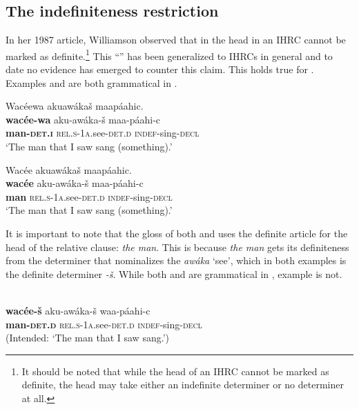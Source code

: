 \documentclass[output=paper]{LSP/langsci}
\begin{document}
\subsection{The indefiniteness restriction}\label{sec:boyle:4.1}

In her 1987 article, Williamson observed that in  the head in an IHRC cannot be marked as definite.\footnote{It should be noted that while the head of an IHRC cannot be marked as definite, the head may take either an indefinite determiner or no determiner at all.} This ``'' has been generalized to IHRCs in general and to date no evidence has emerged to counter this claim. This  holds true for .  Examples  and  are both grammatical in .

\ea  \label{boyle13}
\glll Wac\'eewa akuaw\'aka\v{s} maap\'aahic.\\
\textbf{wac\'ee-wa}     aku-aw\'aka-\v{s}       maa-p\'aahi-c\\
\textbf{man-\textsc{det.i}} \textsc{rel.s-1a}.see-\textsc{det.d} \textsc{indef}-sing-\textsc{decl}\\ 
\trans `The man that I saw sang (something).' 
\z

\ea \label{boyle14}
\glll Wac\'ee akuaw\'aka\v{s} maap\'aahic.\\
\textbf{wac\'ee}  aku-aw\'aka-\v{s} maa-p\'aahi-c\\
\textbf{man} \textsc{rel.s-1a}.see-\textsc{det.d} \textsc{indef}-sing-\textsc{decl}\\
\trans `The man that I saw sang (something).' 
\z

It is important to note that the  gloss of both  and  uses the definite article for the head of the relative clause: \textit{the man}. This is because \textit{the man} gets its definiteness from the determiner that nominalizes the  \textit{aw\'aka} `see', which in both examples is the definite determiner \textit{-\v{s}}. While both  and  are grammatical in , example  is not.

\ea \label{boyle15}
\\
\textbf{wac\'ee-\v{s}}    aku-aw\'aka-\v{s}   waa-p\'aahi-c\\
\textbf{man-\textsc{det.d}} \textsc{rel.s-1a}.see-\textsc{det.d} \textsc{indef}-sing-\textsc{decl}\\
\trans (Intended: `The man that I saw sang.') 
\z
\end{document}
